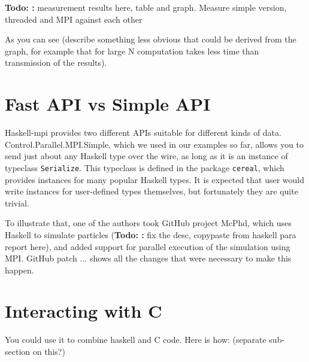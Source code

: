 \documentclass{tmr}
\newcommand{\Todo}[1]{{\textbf{Todo: #1}}}
\begin{document}
\Todo: measurement results here, table and graph. Measure simple version, threaded and MPI against each other

As you can see (describe something less obvious that could be derived
from the graph, for example that for large N computation takes less
time than transmission of the results).

\section{Fast API vs Simple API}

Haskell-mpi provides two different APIs suitable for different kinds
of data. Control.Parallel.MPI.Simple, which we used in our examples so
far, allows you to send just about any Haskell type over the wire, as
long as it is an instance of typeclass \verb|Serialize|. This
typeclass is defined in the package \verb|cereal|, which provides
instances for many popular Haskell types. It is expected that user
would write instances for user-defined types themselves, but
fortunately they are quite trivial.

To illustrate that, one of the authors took GitHub project McPhd,
which uses Haskell to simulate particles (\Todo: fix the desc,
copypaste from haskell para report here), and added support for
parallel execution of the simulation using MPI. GitHub patch ... shows
all the changes that were necessary to make this happen.


\section{Interacting with C}
You could use it to combine haskell and C code. Here is how: (separate sub-section on this?)
\end{document}
